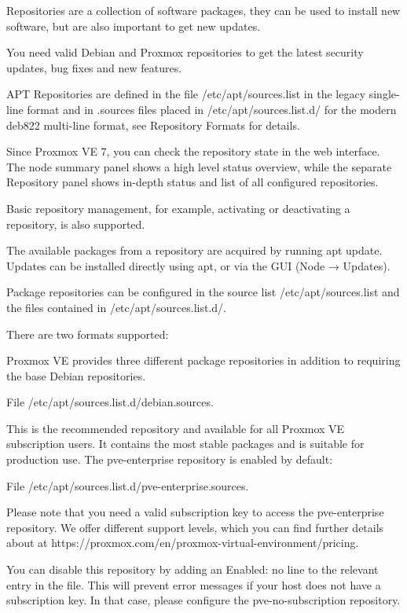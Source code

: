 Repositories are a collection of software packages, they can be used to install new software, but are also important to get new updates.

You need valid Debian and Proxmox repositories to get the latest security updates, bug fixes and new features.

APT Repositories are defined in the file /etc/apt/sources.list in the legacy single-line format and in .sources files placed in /etc/apt/sources.list.d/ for the modern deb822 multi-line format, see Repository Formats for details.

Since Proxmox VE 7, you can check the repository state in the web interface. The node summary panel shows a high level status overview, while the separate Repository panel shows in-depth status and list of all configured repositories.

Basic repository management, for example, activating or deactivating a repository, is also supported.

The available packages from a repository are acquired by running apt update. Updates can be installed directly using apt, or via the GUI (Node → Updates).

Package repositories can be configured in the source list /etc/apt/sources.list and the files contained in /etc/apt/sources.list.d/.

There are two formats supported:

Proxmox VE provides three different package repositories in addition to requiring the base Debian repositories.

File /etc/apt/sources.list.d/debian.sources.

This is the recommended repository and available for all Proxmox VE subscription users. It contains the most stable packages and is suitable for production use. The pve-enterprise repository is enabled by default:

File /etc/apt/sources.list.d/pve-enterprise.sources.

Please note that you need a valid subscription key to access the pve-enterprise repository. We offer different support levels, which you can find further details about at https://proxmox.com/en/proxmox-virtual-environment/pricing.

You can disable this repository by adding an Enabled: no line to the relevant entry in the file. This will prevent error messages if your host does not have a subscription key. In that case, please configure the pve-no-subscription repository.

